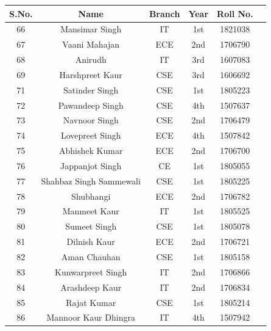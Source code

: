 \documentclass[12pt, a4 paper]{article}
\begin{document}
\begin{table}[h!]
  \begin{center}
    \begin{tabular}{|c|c|c|c|c|c|} 
    \toprule %
      \textbf{S.No.} & \textbf{Name} & \textbf{Branch} & \textbf{Year} &\textbf{Roll No.} \\
\midrule %
66 & Mansimar Singh & IT & 1st &1821038\\
67 & Vaani Mahajan &  ECE & 2nd &1706790\\
68 & Anirudh &  IT & 3rd &1607083\\
69 & Harshpreet Kaur & CSE & 3rd & 1606692\\
71 & Satinder Singh & CSE & 1st &1805223\\
72 & Pawandeep Singh &  CSE & 4th & 1507637\\
73 & Navnoor Singh &  CSE & 2nd &1706479\\
74 & Lovepreet Singh & ECE &  4th &1507842\\
75 & Abhishek Kumar & ECE & 2nd &1706700\\
76 & Jappanjot Singh &  CE & 1st &1805055 \\  
77 & Shahbaz Singh Sammewali & CSE & 1st &1805225 \\
78 & Shubhangi &  ECE & 2nd &1706782 \\  
79 & Manmeet Kaur &  IT & 1st &1805525 \\
80 & Sumeet Singh &  CSE & 1st &1805078 \\
81 & Dilnish Kaur &  ECE & 2nd &1706721 \\  
82 & Aman Chauhan &  CSE & 1st &1805158 \\  
83 & Kunwarpreet Singh &  IT & 2nd & 1706866 \\  
84 & Arashdeep Kaur & IT & 2nd &1706834 \\  
85 & Rajat Kumar & CSE & 1st &1805214 \\  
86 & Mannoor Kaur Dhingra & IT & 4th &1507942 \\

\bottomrule %
    \end{tabular}
  \end{center}
\end{table}
\end{document}
